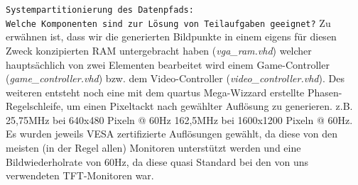 \documentclass{article}
\begin{document}
\texttt{Systempartitionierung des Datenpfads:\\Welche Komponenten sind zur Lösung von Teilaufgaben geeignet?}
\newline
Zu erwähnen ist, dass wir die generierten Bildpunkte in einem eigens für diesen Zweck konzipierten RAM untergebracht haben (\emph{vga\_ram.vhd})
welcher hauptsächlich von zwei Elementen bearbeitet wird einem Game-Controller (\emph{game\_controller.vhd}) bzw. dem Video-Controller 
(\emph{video\_controller.vhd}). Des weiteren entsteht noch eine mit dem quartus Mega-Wizzard erstellte Phasen-Regelschleife, um einen Pixeltackt
nach gewählter Auflösung zu generieren.
z.B. 	25,75MHz bei 640x480 Pixeln @ 60Hz
		162,5MHz bei 1600x1200 Pixeln @ 60Hz.
Es wurden jeweils VESA zertifizierte Auflösungen gewählt, da diese von den meisten (in der Regel allen) Monitoren unterstützt werden und eine
Bildwiederholrate von 60Hz, da diese quasi Standard bei den von uns verwendeten TFT-Monitoren war.		
\vspace{7.5mm}



\newpage

\listoffigures
\printindex
\end{document}
